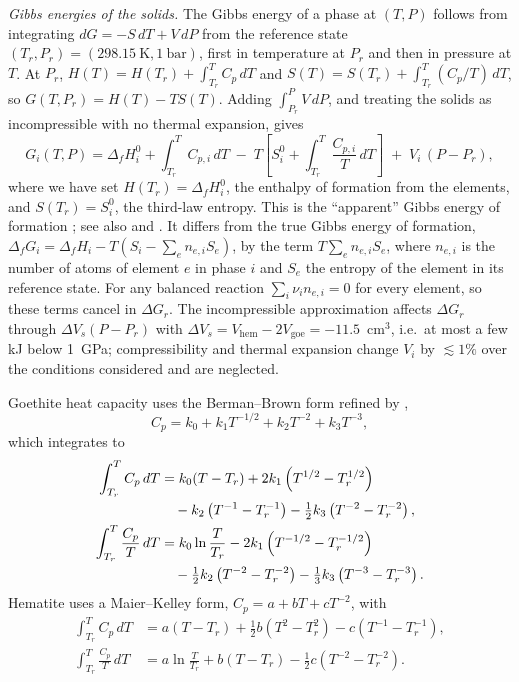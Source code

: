 \textit{Gibbs energies of the solids.} The Gibbs energy of a phase at $(T,P)$ follows from
integrating $dG = -S\,dT + V\,dP$ from the reference state $(T_r,P_r) = (298.15~\mathrm{K}, 1~\mathrm{bar})$,
first in temperature at $P_r$ and then in pressure at $T$. At $P_r$,
$H(T) = H(T_r) + \int_{T_r}^{T}C_p\,dT$ and $S(T) = S(T_r) + \int_{T_r}^{T}(C_p/T)\,dT$, so
$G(T,P_r) = H(T) - T S(T)$. Adding $\int_{P_r}^{P}V\,dP$, and treating the solids as incompressible
with no thermal expansion, gives
\begin{equation}
  G_i(T,P) = \Delta_f H_i^{0} + \int_{T_r}^{T} C_{p,i}\,dT
  \;-\; T\left[S_i^{0} + \int_{T_r}^{T}\frac{C_{p,i}}{T}\,dT\right]
  \;+\; V_i\,(P-P_r),
  \label{eq:gt_Gsolid}
\end{equation}
where we have set $H(T_r) = \Delta_f H_i^{0}$, the enthalpy of formation from the elements, and
$S(T_r) = S_i^{0}$, the third-law entropy. This is the ``apparent'' Gibbs energy of formation
\citep{berman1988}; see also \citet{helgeson1978} and \citet{anderson2005}. It differs from
the true Gibbs energy of formation,
$\Delta_f G_i = \Delta_f H_i - T(S_i - \sum_e n_{e,i} S_e)$, by the term $T\sum_e n_{e,i}S_e$,
where $n_{e,i}$ is the number of atoms of element $e$ in phase $i$ and $S_e$ the entropy of the
element in its reference state. For any balanced reaction $\sum_i \nu_i n_{e,i} = 0$ for every element,
so these terms cancel in $\Delta G_r$. The incompressible approximation affects $\Delta G_r$
through $\Delta V_s (P-P_r)$ with $\Delta V_s = V_{\mathrm{hem}} - 2V_{\mathrm{goe}} = -11.5$~cm$^3$,
i.e.\ at most a few kJ below 1~GPa; compressibility and thermal expansion change $V_i$ by
$\lesssim1\%$ over the conditions considered and are neglected.

Goethite heat capacity uses the Berman--Brown form \citep{berman1985} refined by
\citet{majzlan2003},
\begin{equation}
  C_p = k_0 + k_1 T^{-1/2} + k_2 T^{-2} + k_3 T^{-3},
\end{equation}
which integrates to
\begin{align}
  \int_{T_r}^{T} C_p\,dT &= k_0 (T-T_r) + 2k_1\left(T^{1/2}-T_r^{1/2}\right) \notag\\
    &\quad - k_2\left(T^{-1}-T_r^{-1}\right) - \tfrac{1}{2}k_3\left(T^{-2}-T_r^{-2}\right), \\
  \int_{T_r}^{T} \frac{C_p}{T}\,dT &= k_0 \ln\frac{T}{T_r} - 2k_1\left(T^{-1/2}-T_r^{-1/2}\right) \notag\\
    &\quad - \tfrac{1}{2}k_2\left(T^{-2}-T_r^{-2}\right) - \tfrac{1}{3}k_3\left(T^{-3}-T_r^{-3}\right).
\end{align}
Hematite uses a Maier--Kelley form, $C_p = a + bT + cT^{-2}$, with
\begin{align}
  \int_{T_r}^{T} C_p\,dT &= a(T-T_r) + \tfrac{1}{2}b\left(T^2-T_r^2\right) - c\left(T^{-1}-T_r^{-1}\right), \\
  \int_{T_r}^{T} \frac{C_p}{T}\,dT &= a\ln\frac{T}{T_r} + b(T-T_r) - \tfrac{1}{2}c\left(T^{-2}-T_r^{-2}\right).
\end{align}

